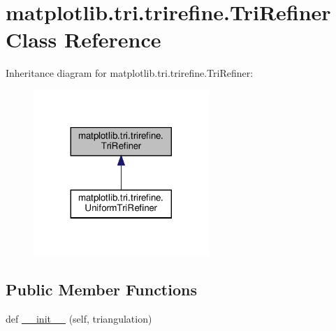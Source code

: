 \hypertarget{classmatplotlib_1_1tri_1_1trirefine_1_1TriRefiner}{}\section{matplotlib.\+tri.\+trirefine.\+Tri\+Refiner Class Reference}
\label{classmatplotlib_1_1tri_1_1trirefine_1_1TriRefiner}


Inheritance diagram for matplotlib.\+tri.\+trirefine.\+Tri\+Refiner\+:
\nopagebreak
\begin{figure}[H]
\begin{center}
\leavevmode
\includegraphics[width=188pt]{classmatplotlib_1_1tri_1_1trirefine_1_1TriRefiner__inherit__graph}
\end{center}
\end{figure}
\subsection*{Public Member Functions}
\begin{DoxyCompactItemize}
\item 
def \hyperlink{classmatplotlib_1_1tri_1_1trirefine_1_1TriRefiner_ab3355dfed0de7977f62f0e4ee3901014}{\+\_\+\+\_\+init\+\_\+\+\_\+} (self, triangulation)
\end{DoxyCompactItemize}


